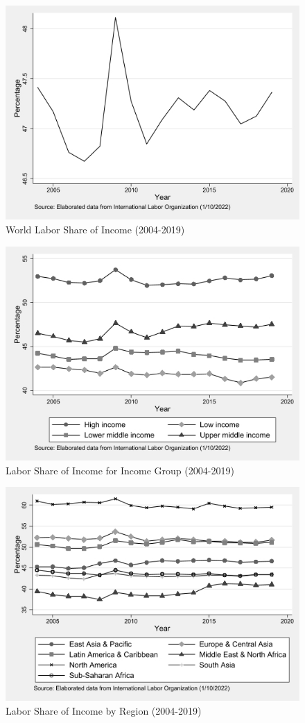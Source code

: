 \documentclass[12pt, letterpaper]{article}
\numberwithin{table}{section}   %
\begin{document}
\begin{figure}[htp!]
    \centering
    \includegraphics[width=11.5cm]{World.jpg}
    \caption{World Labor Share of Income (2004-2019)}
    \label{fig:1}
\end{figure}
\begin{figure}[htp!]
    \centering
    \includegraphics[width=14cm]{Income.jpg}
    \caption{Labor Share of Income for Income Group (2004-2019)}
    \label{fig:2}
\end{figure}
\begin{figure}[htp]
    \centering
    \includegraphics[width=14cm]{Region.jpg}
    \caption{Labor Share of Income by Region (2004-2019)}
    \label{fig:3}
\end{figure}
\end{document}
